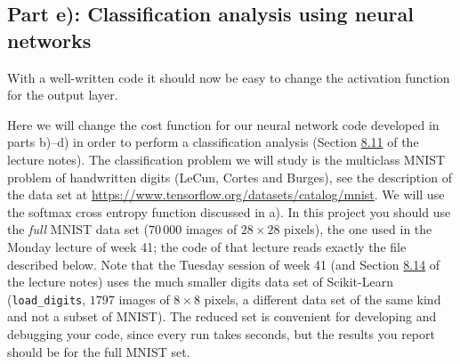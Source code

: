 \documentclass[11pt,a4paper]{article}
\begin{document}
\subsection*{Part e): Classification analysis using neural networks}

With a well-written code it should now be easy to change the activation
function for the output layer.

Here we will change the cost function for our neural network code developed
in parts b)--d) in order to perform a classification analysis (Section
\href{https://educationalmaterialuio.github.io/MachineLearningUiO/doc/LectureNotes/_build/html/chapter8.html#classification-with-neural-networks}{8.11}
of the lecture notes).  The classification problem we will study is the
multiclass MNIST problem of handwritten digits (LeCun, Cortes and Burges),
see the description of the data set at
\url{https://www.tensorflow.org/datasets/catalog/mnist}.  We will use the
softmax cross entropy function discussed in a).  In this project you should
use the \emph{full} MNIST data set ($70\,000$ images of $28\times 28$
pixels), the one used in the Monday lecture of week 41; the code of that
lecture reads exactly the file described below.  Note that the Tuesday
session of week 41 (and Section
\href{https://educationalmaterialuio.github.io/MachineLearningUiO/doc/LectureNotes/_build/html/chapter8.html#examples}{8.14}
of the lecture notes) uses the much smaller digits data set of Scikit-Learn
(\texttt{load\_digits}, $1797$ images of $8\times 8$ pixels, a different data
set of the same kind and not a subset of MNIST).  The reduced set is
convenient for developing and debugging your code, since every run takes
seconds, but the results you report should be for the full MNIST set.
\end{document}
